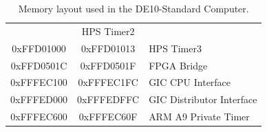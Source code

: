\documentclass[11pt, twoside, pdftex]{article}
\newcommand{\commonFiles}{../../../common/doc}
\newcommand{\templatePath}{../../../common/templates}
\newcommand{\systemName}{DE10-Standard Computer}
\begin{document}
\begin{table}[h]
\begin{center}
\begin{tabular}{c|c|l}
            & HPS Timer2
        \\
            0xFFD01000
            & 0xFFD01013
            & HPS Timer3
        \\
            0xFFD0501C
            & 0xFFD0501F
            & FPGA Bridge
        \\
            0xFFFEC100
            & 0xFFFEC1FC
            & GIC CPU Interface
        \\
            0xFFFED000
            & 0xFFFEDFFC
            & GIC Distributor Interface
        \\
            0xFFFEC600
            & 0xFFFEC60F
            & ARM A9 Private Timer
        \\
    \end{tabular}
    \caption{Memory layout used in the \systemName.}
    \label{tab:memorylayout}
    \end{center}
\end{table}




\clearpage












\end{document}

